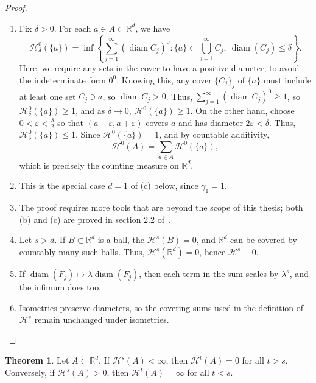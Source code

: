 \documentclass[12pt,a4paper]{report}
\theoremstyle{definition}
\newtheorem{theorem}{Theorem}
\begin{document}
\begin{proof}
\begin{enumerate}[label=\textnormal{(\alph*)}]
\item Fix $\delta > 0$. For each $ a \in A \subset \mathbb{R}^d$, we have
\[
\mathcal{H}^0_\delta(\{a\}) = \inf \left\{ \sum_{j=1}^\infty (\operatorname{diam} C_j)^0 : \{a\} \subset \bigcup_{j=1}^\infty C_j,\ \operatorname{diam}(C_j) \leq \delta \right\}.
\]
Here, we require any sets in the cover to have a positive diameter, to avoid the indeterminate form $0^0$. Knowing this, any cover $\{C_j\}_j$ of $\{a\}$ must include at least one set $C_j \ni a$, so $\operatorname{diam} C_j > 0$. Thus, $\sum_{j=1}^\infty (\operatorname{diam} C_j)^0 \geq 1$, so $\mathcal{H}^0_\delta(\{a\}) \geq 1$, and as $\delta \to 0$, $\mathcal{H}^0(\{a\}) \geq 1$. On the other hand, choose $0 < \varepsilon < \frac{\delta}{2}$ so that $(a-\varepsilon, a+ \varepsilon)$ covers $a$ and has diameter $2\varepsilon<\delta$. Thus, $\mathcal{H}^0_\delta(\{a\}) \leq 1$.
Since \( \mathcal{H}^0(\{a\}) = 1 \), and by countable additivity,
\[
\mathcal{H}^0(A) = \sum_{a \in A} \mathcal{H}^0(\{a\}),
\]
which is precisely the counting measure on $\mathbb{R}^d$.
\item This is the special case $d = 1$ of (c) below, since $\gamma_1 = 1$.
\item The proof requires more tools that are beyond the scope of this thesis; both (b) and (c) are proved in section 2.2 of~\cite{evans1992measure}.
\item Let \( s > d \). If $B \subset \mathbb{R}^d$ is a ball, the $\mathcal{H}^s(B) = 0$, and \( \mathbb{R}^d \) can be covered by countably many such balls. Thus, \( \mathcal{H}^s(\mathbb{R}^d) = 0 \), hence \( \mathcal{H}^s \equiv 0 \).

\item If \( \operatorname{diam}(F_j) \mapsto \lambda \operatorname{diam}(F_j) \), then each term in the sum scales by \( \lambda^s \), and the infimum does too.

\item Isometries preserve diameters, so the covering sums used in the definition of \( \mathcal{H}^s \) remain unchanged under isometries.
\end{enumerate}
\end{proof}

\begin{theorem} \label{hdim}
Let $A \subset \mathbb{R}^d$. If \(\mathcal{H}^s(A) < \infty\), then \(\mathcal{H}^t(A) = 0\) for all \(t > s\). Conversely, if \(\mathcal{H}^s(A) > 0\), then \(\mathcal{H}^t(A) = \infty\) for all \(t < s\).
\end{theorem}
\end{document}
